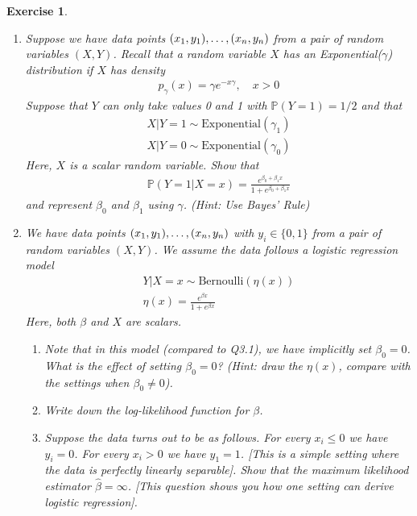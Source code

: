 \documentclass[12pt]{article}
\theoremstyle{colon}
\newtheorem{exercise}{Exercise}
\begin{document}
\begin{exercise}
  \begin{enumerate}[label=\arabic*)]
    \item Suppose we have data points $(x_1, y_1), \mathellipsis, (x_n, y_n)$ from a pair of random variables $(X,Y)$. Recall that a random variable $X$ has an Exponential($\gamma$) distribution if $X$ has density
      \begin{gather*}
        p_\gamma (x) = \gamma e^{-x \gamma}, \quad x > 0
      \end{gather*}
      Suppose that $Y$ can only take values 0 and 1 with $\mathbb{P}(Y=1) = 1/2$ and that
      \begin{gather*}
        X | Y = 1 \sim \text{Exponential}(\gamma_1) \\
        X | Y = 0 \sim \text{Exponential}(\gamma_0)
      \end{gather*}
      Here, $X$ is a scalar random variable. Show that
      \begin{gather*}
        \mathbb{P}(Y = 1 | X = x) = \frac{e^{\beta_0 + \beta_1 x}}{1 + e^{\beta_0 + \beta_1 x}}
      \end{gather*}
      and represent $\beta_0$ and $\beta_1$ using $\gamma$. (Hint: Use Bayes' Rule)

    \item We have data points $(x_1, y_1), \mathellipsis, (x_n, y_n)$ with $y_i \in \{0,1\}$ from a pair of random variables $(X,Y)$. We assume the data follows a logistic regression model
      \begin{gather*}
        Y | X = x \sim \text{Bernoulli}(\eta(x)) \\
        \eta(x) = \frac{e^{\beta x}}{1 + e^{\beta x}}
      \end{gather*}
      Here, both $\beta$ and $X$ are scalars.
      \begin{enumerate}[label=\alph*)]
        \item Note that in this model (compared to Q3.1), we have implicitly set $\beta_0 = 0$. What is the effect of setting $\beta_0 = 0$? (Hint: draw the $\eta(x)$, compare with the settings when $\beta_0 \neq 0$).
        \item Write down the log-likelihood function for $\beta$.
        \item Suppose the data turns out to be as follows. For every $x_i \leq 0$ we have $y_i = 0$. For every $x_i > 0$ we have $y_1 = 1$. [This is a simple setting where the data is perfectly linearly separable]. Show that the maximum likelihood estimator $\hat{\beta} = \infty$. [This question shows you how one setting can derive logistic regression].
      \end{enumerate}
  \end{enumerate}
\end{exercise}
\end{document}
